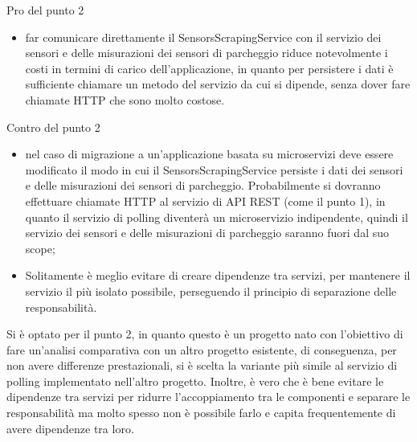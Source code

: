 \leavevmode\newline
Pro del punto 2
\begin{itemize}
    \item far comunicare direttamente il SensorsScrapingService con il servizio dei sensori e delle misurazioni dei sensori di parcheggio
        riduce notevolmente i costi in termini di carico dell'applicazione, in quanto per persistere i dati è sufficiente chiamare un
        metodo del servizio da cui si dipende, senza dover fare chiamate \gls{HTTP} che sono molto costose. 
\end{itemize}
\leavevmode\newline
Contro del punto 2
\begin{itemize}
    \item nel caso di migrazione a un'applicazione basata su microservizi deve essere modificato il modo in cui il SensorsScrapingService 
        persiste i dati dei sensori
        e delle misurazioni dei sensori di parcheggio. Probabilmente si dovranno effettuare chiamate \gls{HTTP} al servizio di \gls{API} \gls{REST} (come il punto 1),
        in quanto il servizio di polling diventerà un microservizio indipendente, quindi il servizio dei 
        sensori e delle misurazioni di parcheggio saranno fuori dal suo scope;
    \item Solitamente è meglio evitare di creare dipendenze tra servizi, per mantenere il servizio il più isolato possibile, perseguendo il
        principio di separazione delle responsabilità.
\end{itemize}
\leavevmode\newline
Si è optato per il punto 2, in quanto questo è un progetto nato con l'obiettivo di fare un'analisi comparativa con un altro progetto esistente,
di conseguenza, per non avere differenze prestazionali, si è scelta la variante più simile al 
servizio di polling implementato nell'altro progetto. Inoltre, è vero che è bene evitare le dipendenze tra servizi per ridurre
l'accoppiamento tra le componenti e separare le responsabilità ma molto spesso non è possibile farlo e capita frequentemente
di avere dipendenze tra loro.

